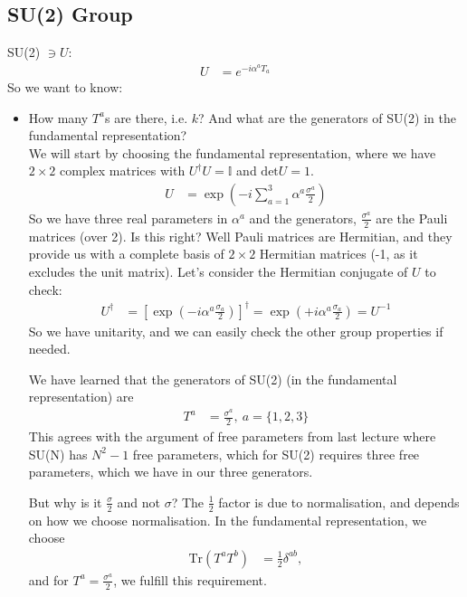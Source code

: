 \documentclass[a4paper, 11pt, normalem]{report}
\begin{document}
\subsection{SU(2) Group}
SU(2) $\ni U$:
\begin{align}
    U &= e^{-i\alpha^a T_a}
\end{align}
So we want to know:
\begin{itemize}
    \item How many $T^a$s are there, i.e. $k$? And what are the generators of SU(2) in the fundamental representation? \\
        We will start by choosing the fundamental representation, where we have $2\times2$ complex matrices with $U^\dagger U = \mathbb{I}$ and $\text{det}U = 1$.
        \begin{align}
            U &= \exp\left(-i\sum_{a=1}^3 \alpha^a\frac{\sigma^a}{2}\right)
        \end{align}
        So we have three real parameters in $\alpha^a$ and the generators, $\frac{\sigma^a}{2}$ are the Pauli matrices (over 2).
        Is this right?
        Well Pauli matrices are Hermitian, and they provide us with a complete basis of $2\times2$ Hermitian matrices (-1, as it excludes the unit matrix).
        Let's consider the Hermitian conjugate of $U$ to check:
        \begin{align}
            U^\dagger &= \left[\exp\left(-i\alpha^a\frac{\sigma_a}{2}\right)\right]^\dagger = \exp\left(+i\alpha^a\frac{\sigma_a}{2}\right) = U^{-1}
        \end{align}
        So we have unitarity, and we can easily check the other group properties if needed.

        We have learned that the generators of SU(2) (in the fundamental representation) are
        \begin{align}
            T^a &= \frac{\sigma^a}{2},~ a = \{1,2,3\}
        \end{align}
        This agrees with the argument of free parameters from last lecture where SU(N) has $N^2-1$ free parameters, which for SU(2) requires three free parameters, which we have in our three generators.

        But why is it $\frac{\sigma}{2}$ and not $\sigma$? The $\frac12$ factor is due to normalisation, and depends on how we choose normalisation.
        In the fundamental representation, we choose
        \begin{align}
            \text{Tr}(T^aT^b) &= \frac12 \delta^{ab},
        \end{align}
        and for $T^a = \frac{\sigma^a}{2}$, we fulfill this requirement.


\end{itemize}
\end{document}
